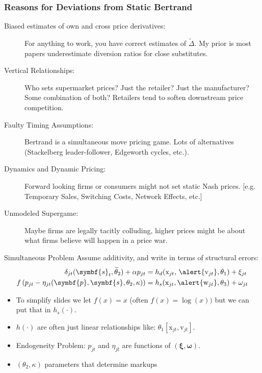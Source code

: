 \documentclass[aspectratio=169,10pt]{beamer}
\begin{document}
\begin{frame}
\frametitle{Reasons for Deviations from Static Bertrand}
\small
\begin{description}
\item[Biased estimates of own and cross price derivatives:] For anything to work, you have correct estimates of $\tilde{\Delta}$. My prior is most papers \alert{underestimate} diversion ratios for close substitutes.
\item[Vertical Relationships:] Who sets supermarket prices? Just the retailer? Just the manufacturer? Some combination of both? Retailers tend to \alert{soften} downstream price competition.
\item[Faulty Timing Assumptions:] Bertrand is a simultaneous move pricing game. Lots of alternatives (Stackelberg leader-follower, Edgeworth cycles, etc.).
\item[Dynamics and Dynamic Pricing:] Forward looking firms or consumers might not set static Nash prices. [e.g. Temporary Sales, Switching Costs, Network Effects, etc.]
\item[Unmodeled Supergame:] Maybe firms are legally tacitly colluding, higher prices might be about what firms believe will happen in a price war.
\end{description}
\end{frame}


\begin{frame}{Simultaneous Problem}
Assume additivity, and write in terms of structural errors:
\begin{align*}
\delta_{jt}(\symbf{s}_t,\widetilde{\theta}_2) + \alpha p_{jt} &= h_d(\textrm{x}_{jt}, \, \alert{\textrm{v}_{jt}},\theta_1)  + \xi_{jt} \\
 f \left( p_{jt} - \eta_{jt}(\symbf{p},\symbf{s},\theta_2,\kappa) \right) &= h_s(\textrm{x}_{jt}, \alert{\textrm{w}_{jt}},\theta_3) + \omega_{jt}
\end{align*}
\vspace{-.4cm}
\begin{itemize}
 \item To simplify slides we let $f(x)=x$ (often $f(x) =\log(x))$ but we can put that in $h_s(\cdot)$.
\item $h(\cdot)$ are often just linear relationships like: $\theta_1 [\textrm{x}_{jt}, \textrm{v}_{jt}]$.
\item Endogeneity Problem: $p_{jt}$ and $\eta_{jt}$ are functions of $(\symbf{\xi},\symbf{\omega})$.
\item $(\theta_2, \kappa)$ parameters that determine markups
\end{itemize}
\end{frame}
\end{document}
